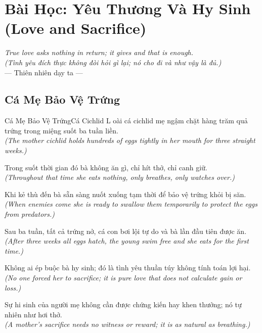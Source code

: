 \chapter{Bài Học: Yêu Thương Và Hy Sinh (Love and Sacrifice)}
\begin{center}
  \textit{\color{truyenblue}True love asks nothing in return; it gives and that is enough.}\\
  \textit{(Tình yêu đích thực không đòi hỏi gì lại; nó cho đi và như vậy là đủ.)}\\[4pt]
  \small\color{truyengold}--- Thiên nhiên dạy ta ---
\end{center}
\ngancach

\section{Cá Mẹ Bảo Vệ Trứng}
\begin{truyen}{Cá Mẹ Bảo Vệ Trứng}{Cá Cichlid}
L oài cá cichlid mẹ ngậm chặt hàng trăm quả trứng trong miệng suốt ba tuần liền.\\
\textit{(The mother cichlid holds hundreds of eggs tightly in her mouth for three straight weeks.)}

Trong suốt thời gian đó bà không ăn gì, chỉ hít thở, chỉ canh giữ.\\
\textit{(Throughout that time she eats nothing, only breathes, only watches over.)}

Khi kẻ thù đến bà sẵn sàng nuốt xuống tạm thời để bảo vệ trứng khỏi bị săn.\\
\textit{(When enemies come she is ready to swallow them temporarily to protect the eggs from predators.)}

Sau ba tuần, tất cả trứng nở, cá con bơi lội tự do và bà lần đầu tiên được ăn.\\
\textit{(After three weeks all eggs hatch, the young swim free and she eats for the first time.)}

Không ai ép buộc bà hy sinh; đó là tình yêu thuần túy không tính toán lợi hại.\\
\textit{(No one forced her to sacrifice; it is pure love that does not calculate gain or loss.)}

\end{truyen}
\begin{baihoc}
  Sự hi sinh của người mẹ không cần được chứng kiến hay khen thưởng; nó tự nhiên như hơi thở.\\
  \textit{(A mother's sacrifice needs no witness or reward; it is as natural as breathing.)}
\end{baihoc}

